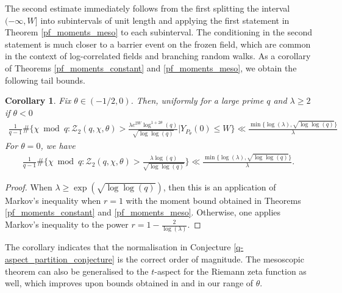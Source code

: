 \documentclass[10pt,a4paper]{amsart}
\newtheorem{corollary}{Corollary}
\numberwithin{equation}{section}
\begin{document}
The second estimate immediately follows from the first splitting the interval $(-\infty,W]$ into subintervals of unit length and applying the first statement in Theorem \ref{pf_moments_meso} to each subinterval. The conditioning in the second statement is much closer to a barrier event on the frozen field, which are common in the context of log-correlated fields and branching random walks. As a corollary of Theorems \ref{pf_moments_constant} and \ref{pf_moments_meso}, we obtain the following tail bounds.
\begin{corollary} \label{typical_partition_size}
    \textit{Fix $\theta \in (-1/2,0)$. Then, uniformly for a large prime $q$ and $\lambda \geq 2$ if $\theta <0$}
     \begin{align*}
        \frac{1}{q-1}\#\big\{\chi \bmod{q}:\mathcal{Z}_2(q,\chi,\theta) > \frac{\lambda e^{2W} \log^{1+2\theta}(q)}{\sqrt{\log\log(q)}} \big| Y_{P_\theta}(0) \leq W\big\} 
        \ll \frac{\min\{\log(\lambda),\sqrt{\log\log(q)}\}}{\lambda}
    \end{align*}
    \textit{For $\theta=0$, we have}
    \begin{align*}
        \frac{1}{q-1}\#\big\{\chi \bmod{q}:\mathcal{Z}_2(q,\chi,\theta) > \frac{\lambda \log(q)}{\sqrt{\log\log(q)}}\big\} 
        \ll \frac{\min\{\log(\lambda),\sqrt{\log\log(q)}\}}{\lambda}.
    \end{align*}
\end{corollary}
\begin{proof}
    When $\lambda \geq \exp(\sqrt{\log\log(q)})$, then this is an application of Markov's inequality when $r=1$ with the moment bound obtained in Theorems \ref{pf_moments_constant} and \ref{pf_moments_meso}. Otherwise, one applies Markov's inequality to the power $r=1-\frac{2}{\log(\lambda)}$.
\end{proof}
The corollary indicates that the normalisation in Conjecture \ref{q-aspect_partition_conjecture} is the correct order of magnitude. The mesoscopic theorem can also be generalised to the $t$-aspect for the Riemann zeta function as well, which improves upon bounds obtained in \cite{aor21} and \cite{ah24} in our range of $\theta$. \par
\end{document}
